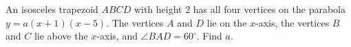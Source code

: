 An isosceles trapezoid $ABCD$ with height $2$ has all four vertices on the parabola $y=a(x+1)(x-5)$. The vertices $A$ and $D$ lie on the $x$-axis, the vertices $B$ and $C$ lie above the $x$-axis, and $\angle BAD=60^\circ$. Find $a$.
